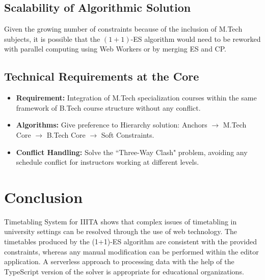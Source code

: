 \subsection{Scalability of Algorithmic Solution}

Given the growing number of constraints because of the inclusion of M.Tech subjects, it is possible that the $(1+1)$-ES algorithm would need to be reworked with parallel computing using Web Workers or by merging ES and CP.

\subsection{Technical Requirements at the Core}

\begin{itemize}

    \item \textbf{Requirement:} Integration of M.Tech specialization courses within the same framework of B.Tech course structure without any conflict.

    \item \textbf{Algorithms:} Give preference to Hierarchy solution: Anchors $\rightarrow$ M.Tech Core $\rightarrow$ B.Tech Core $\rightarrow$ Soft Constraints.

    \item \textbf{Conflict Handling:} Solve the ``Three-Way Clash" problem, avoiding any schedule conflict for instructors working at different levels.

\end{itemize}   
\section{Conclusion}

Timetabling System for IIITA shows that complex issues of timetabling in university settings can be resolved through the use of web technology. The timetables produced by the (1+1)-ES algorithm are consistent with the provided constraints, whereas any manual modification can be performed within the editor application. A serverless approach to processing data with the help of the TypeScript version of the solver is appropriate for educational organizations.